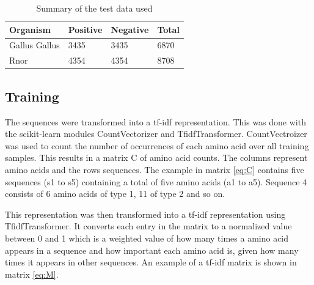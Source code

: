 \documentclass[10pt]{article}
\begin{document}
\begin{table}[h]
\begin{center}
\begin{tabular}{| l | l | l | l |}
\hline
Organism & Positive & Negative & Total\\ \hline
Gallus Gallus & 3435 & 3435 & 6870\\ \hline
Rnor & 4354 & 4354 & 8708\\ \hline
\end{tabular}
\end{center}
\caption{Summary of the test data used}
\label{table:testdata}
\end{table}

\subsection{Training}
The sequences were transformed into a tf-idf representation. This was done with the scikit-learn modules CountVectorizer and TfidfTransformer.
CountVectroizer was used to count the number of occurrences of each amino acid over all training samples. This results in a matrix C of amino acid counts.
The columns represent amino acids and the rows sequences.
The example in matrix \ref{eq:C} contains five sequences (s1 to s5) containing a total of five amino acids (a1 to a5). Sequence 4 consists of 6 amino acids of type 1, 11 of type 2 and so on.

This representation was then transformed into a tf-idf representation using TfidfTransformer. It converts each entry in the matrix to a normalized value between 0 and 1 which is a weighted value of how many times a amino acid appears in a sequence and how important each amino acid is, given how many times it appears in other sequences.
An example of a tf-idf matrix is shown in matrix \ref{eq:M}.
\end{document}
